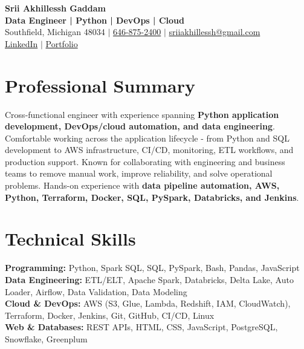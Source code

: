 \documentclass[letterpaper,10pt]{article}
\begin{document}
\fontsize{9.35pt}{10.45pt}\selectfont

\begin{center}
    {\LARGE \textbf{Srii Akhillessh Gaddam}} \\[-1pt]
    \textbf{Data Engineer | Python | DevOps | Cloud} \\[2pt]
    Southfield, Michigan 48034 $|$
    \href{tel:6468752400}{646-875-2400} $|$
    \href{mailto:sriiakhillessh@gmail.com}{sriiakhillessh@gmail.com} \\[1pt]
    \href{https://www.linkedin.com/in/srii-akhiilessh-gaddam-b48668191/}{LinkedIn} $|$
    \href{https://sriiakhillesshg.github.io/portfolio/}{Portfolio}
\end{center}
\vspace{-8pt}

\section{Professional Summary}
\small{Cross-functional engineer with experience spanning \textbf{Python application development, DevOps/cloud automation, and data engineering}. Comfortable working across the application lifecycle - from Python and SQL development to AWS infrastructure, CI/CD, monitoring, ETL workflows, and production support. Known for collaborating with engineering and business teams to remove manual work, improve reliability, and solve operational problems. Hands-on experience with \textbf{data pipeline automation, AWS, Python, Terraform, Docker, SQL, PySpark, Databricks, and Jenkins}.}

\section{Technical Skills}
\small{
\textbf{Programming:} Python, Spark SQL, SQL, PySpark, Bash, Pandas, JavaScript \\
\textbf{Data Engineering:} ETL/ELT, Apache Spark, Databricks, Delta Lake, Auto Loader, Airflow, Data Validation, Data Modeling \\
\textbf{Cloud \& DevOps:} AWS (S3, Glue, Lambda, Redshift, IAM, CloudWatch), Terraform, Docker, Jenkins, Git, GitHub, CI/CD, Linux \\
\textbf{Web \& Databases:} REST APIs, HTML, CSS, JavaScript, PostgreSQL, Snowflake, Greenplum
}

\end{document}
